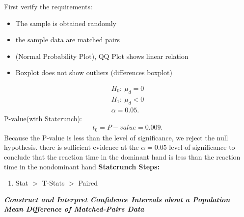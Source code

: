 \documentclass{report}
\begin{document}
\begin{mdframed}
      \bigbreak \noindent 
      First verify the requirements:
      \begin{itemize}
          \item The sample is obtained randomly
            \item the sample data are matched pairs
            \item (Normal Probability Plot), QQ Plot shows linear relation 
            \item Boxplot does not show outliers (differences boxplot)
      \end{itemize}
      \begin{align*}
          H_{0}:\ \mu_{d} = 0\\
          H_{1}:\ \mu_{d} < 0 \\
          \alpha = 0.05
      .\end{align*}
      \bigbreak \noindent 
      P-value(with Statcrunch):
      \begin{align*}
          t_{0}  = P-value = 0.009
      .\end{align*}
      \bigbreak \noindent 
      Because the P-value is less than the level of significance, we reject the null hypothesis.
      \bigbreak \noindent 
      there is sufficient evidence at the $\alpha = 0.05 $ level of significance to conclude that the reaction time in the dominant hand is less than the reaction time in the nondominant hand
      \bigbreak \noindent 
      \textbf{Statcrunch Steps:}
      \begin{enumerate}
          \item Stat $> $ T-Stats $> $ Paired
      \end{enumerate}



    \end{mdframed}
    \pagebreak \bigbreak \noindent 
    \textbf{\textit{Construct and Interpret Confidence Intervals about a Population Mean Difference of Matched-Pairs Data}}
    \bigbreak \noindent 
\end{document}
